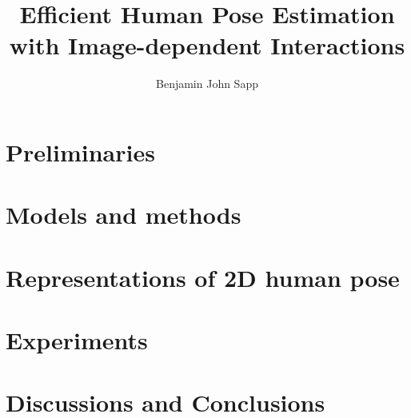 \documentclass[12pt]{report}%
\theoremstyle{plain} \newtheorem{problem}{Problem}
\begin{document}

\newcommand{\mytitle}{Efficient Human Pose Estimation with Image-dependent 
Interactions}
\newcommand{\MYTITLE}{EFFICIENT HUMAN POSE ESTIMATION WITH IMAGE-DEPENDENT 
INTERACTIONS}

\title{\mytitle}
\author{Benjamin John Sapp}


  
 \beforepreface
\newpage
\copyrightpage
{}

\newpage
\abstractp

\afterpreface
% 

\newpage
{}
\pagestyle{plain}


\part{Preliminaries}




\clearpage
\part{Models and methods}




\clearpage
\part{Representations of 2D human pose}


\clearpage
\part{Experiments}\label{sec:experiments}



\clearpage
\part{Discussions and Conclusions}



\clearpage


\end{document}
